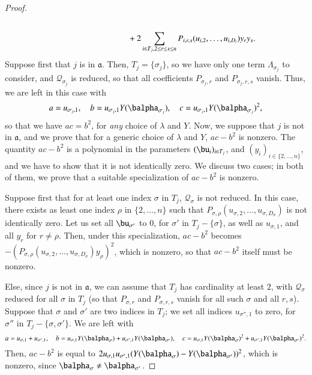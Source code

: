 \documentclass[final,1p,times,authoryear]{elsarticle}
\newcommand{\mf}{Y}
\newcommand{\residueI}{\mathscr{Q}}
\begin{document}
\begin{proof}
\begin{align*}
   \\ & \phantom{{ }= \sum_{i\in T_j}u_{i,1} \mf(\balpha_i)^2}
   +2 \sum_{i \in T_j, 2 \le r \le s \le n} P_{i,r,s}(u_{i,2},\dots,u_{i,D_i})y_ry_s.
  \end{align*}
  Suppose first that $j$ is in $\mathfrak{a}$. Then, $T_j=\{\sigma_j\}$, so we 
  have only one term $\Lambda_{\sigma_j}$ to consider, and $\residueI_{\sigma_j}$ 
  is reduced, so that all coefficients $P_{\sigma_j,r}$ and
  $P_{\sigma_j,r,s}$ vanish. Thus, we are left in
  this case with
  $$
  a = u_{\sigma_j,1}, \quad
  b = u_{\sigma_j,1} \mf(\balpha_{\sigma_j}), \quad
  c = u_{\sigma_j,1} \mf(\balpha_{\sigma_j})^2,
  $$ so that we have $ac=b^2$, for {\em any} choice of $\lambda$ and
  $\mf$. Now, we suppose that $j$ is not in $\mathfrak{a}$, and we prove
  that for a generic choice of $\lambda$ and $\mf$, $ac-b^2$ is nonzero.
  The quantity $ac-b^2$ is a polynomial in the parameters
  $(\bu_i)_{i\in T_j}$, and $(y_i)_{i \in \{2,\dots,n\}}$, and we have
  to show that it is not identically zero. We discuss two cases; in both
  of them, we prove that a suitable specialization of $ac-b^2$ is
  nonzero.

  Suppose first that for at least one index $\sigma$ in $T_j$,
  $\residueI_\sigma$ is not reduced. In this case, there exists as least one
  index $\rho$ in $\{2,\dots,n\}$ such that
  $P_{\sigma,\rho}(u_{\sigma,2},\dots,u_{\sigma,D_\sigma})$ is not
  identically zero. Let us set all $\bu_{\sigma'}$
  to $0$, for $\sigma'$ in $T_j-\{\sigma\}$, as well as $u_{\sigma,1}$,
  and all $y_r$ for $r\ne \rho$. Then, under this specialization,
  $ac-b^2$ becomes
  $-(P_{\sigma,\rho}(u_{\sigma,2},\dots,u_{\sigma,D_\sigma})y_\rho)^2$,
  which is nonzero, so that $ac-b^2$ itself must be nonzero.

  Else, since $j$ is not in $\mathfrak{a}$, we can assume that $T_j$
  has cardinality at least $2$, with $\residueI_\sigma$ reduced for all $\sigma$
  in $T_j$ (so that $P_{\sigma,r}$ and $P_{\sigma,r,s}$ vanish for 
  all such $\sigma$ and all $r,s$). Suppose that $\sigma$ and $\sigma'$ are two indices in
  $T_j$; we set all indices $u_{\sigma'',1}$ to zero, for $\sigma''$
  in $T_j-\{\sigma,\sigma'\}$. We are left with
  $$
  a=u_{\sigma,1}+u_{\sigma',1},\quad
  b=u_{\sigma,1}\mf(\balpha_{\sigma})+u_{\sigma',1}\mf(\balpha_{\sigma'}),\quad
  c=u_{\sigma,1}\mf(\balpha_{\sigma})^2+u_{\sigma',1}\mf(\balpha_{\sigma'})^2.
  $$
  Then, $ac-b^2$ is equal to $2u_{\sigma,1}u_{\sigma',1}(\mf(\balpha_{\sigma})-\mf(\balpha_{\sigma'}))^2$,
  which is nonzero, since $\balpha_\sigma \ne \balpha_{\sigma'}$.
\end{proof}
\end{document}
